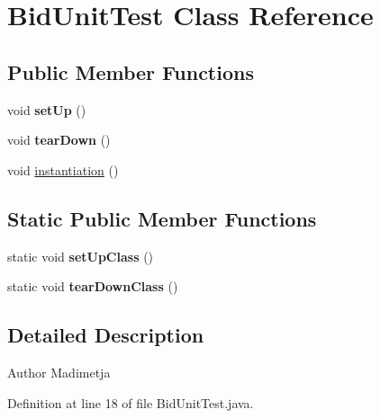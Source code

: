 \hypertarget{class_bid_unit_test}{\section{Bid\+Unit\+Test Class Reference}
\label{class_bid_unit_test}
}
\subsection*{Public Member Functions}
\begin{DoxyCompactItemize}
\item 
\hypertarget{class_bid_unit_test_a17ac735be171e68824a4ab6aee2427c6}{void {\bfseries set\+Up} ()}\label{class_bid_unit_test_a17ac735be171e68824a4ab6aee2427c6}

\item 
\hypertarget{class_bid_unit_test_a1e3ac3daf16cfb03129bc9c6ec29004c}{void {\bfseries tear\+Down} ()}\label{class_bid_unit_test_a1e3ac3daf16cfb03129bc9c6ec29004c}

\item 
void \hyperlink{class_bid_unit_test_a00b30251528b2203d6d9f17c321bc499}{instantiation} ()
\end{DoxyCompactItemize}
\subsection*{Static Public Member Functions}
\begin{DoxyCompactItemize}
\item 
\hypertarget{class_bid_unit_test_a708398bb9f31d775f2a8cadfa7de00ad}{static void {\bfseries set\+Up\+Class} ()}\label{class_bid_unit_test_a708398bb9f31d775f2a8cadfa7de00ad}

\item 
\hypertarget{class_bid_unit_test_a63ef12d1e873a8b1dd37a8d1009a2a2f}{static void {\bfseries tear\+Down\+Class} ()}\label{class_bid_unit_test_a63ef12d1e873a8b1dd37a8d1009a2a2f}

\end{DoxyCompactItemize}


\subsection{Detailed Description}
\begin{DoxyAuthor}{Author}
Madimetja 
\end{DoxyAuthor}


Definition at line 18 of file Bid\+Unit\+Test.\+java.



